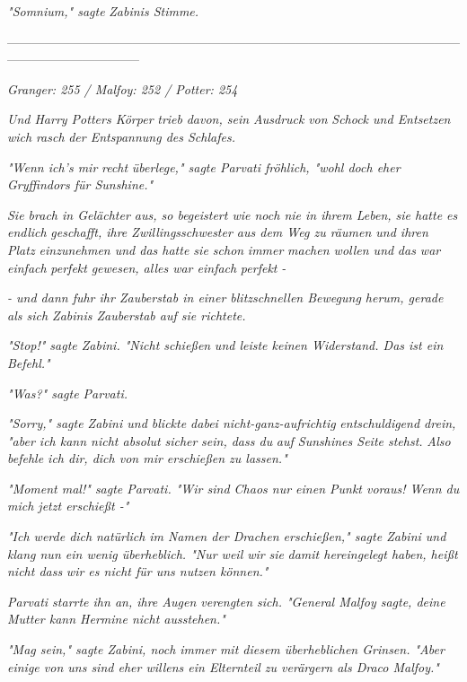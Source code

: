 {\emph{"\emph{Somnium,}" sagte} \emph{Zabinis Stimme.}

--------------------------------------------------------------------------------------------------------------------------------------------

\emph{Granger: 255 / Malfoy: 252 / Potter: 254}

\emph{Und Harry Potters Körper} \emph{trieb} \emph{davon, sein Ausdruck} \emph{von} \emph{Schock und Entsetzen wich} \emph{rasch} \emph{der Entspannung des Schlafes.}

\emph{"Wenn ich's mir} \emph{recht} \emph{überlege," sagte Parvati fröhlich, "wohl doch eher Gryffindors für Sunshine."}

\emph{Sie brach in Gelächter aus, so begeistert wie noch nie in ihrem Leben, sie hatte es} \emph{\emph{endlich}} \emph{geschafft, ihre Zwillingsschwester aus dem Weg zu räumen und ihren Platz einzunehmen und das hatte sie schon} \emph{\emph{immer}} \emph{machen wollen und} \emph{das war einfach} \emph{\emph{perfekt}} \emph{gewesen, alles war einfach} \emph{\emph{perfekt}} \emph{-}

\emph{- und dann fuhr ihr Zauberstab in einer blitzschnellen Bewegung herum, gerade als sich Zabinis Zauberstab auf sie richtete.}

\emph{"Stop!" sagte Zabini. "Nicht schießen} \emph{und leiste keinen Widerstand. Das ist ein Befehl."}

\emph{"\emph{Was?}" sagte Parvati.}

\emph{"Sorry," sagte Zabini und blickte dabei nicht-ganz-aufrichtig} \emph{entschuldigend drein, "aber ich kann nicht absolut} \emph{\emph{sicher}} \emph{sein, dass du} \emph{auf Sunshines Seite stehst.} \emph{Also befehle ich dir, dich von mir erschießen zu lassen."}

\emph{"\emph{Moment mal!}" sagte Parvati. "Wir sind Chaos nur einen Punkt voraus! Wenn du mich jetzt erschießt -"}

\emph{"Ich werde dich} \emph{\emph{natürlich}} \emph{im Namen der Drachen erschießen," sagte Zabini und klang nun ein wenig überheblich. "Nur weil wir} \emph{\emph{sie}} \emph{damit hereingelegt haben, heißt nicht dass} \emph{wir es nicht für uns nutzen können."}

\emph{Parvati starrte ihn an, ihre Augen verengten sich. "General Malfoy sagte, deine Mutter kann Hermine nicht ausstehen."}

\emph{"Mag sein," sagte Zabini, noch immer mit diesem überheblichen Grinsen. "Aber einige von uns sind eher willens ein Elternteil zu verärgern als Draco Malfoy."}

}

